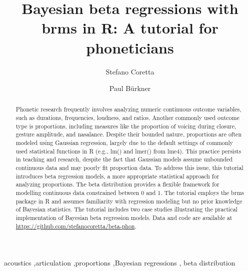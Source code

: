 \documentclass[
  authoryear,
  preprint,
  3p]{elsarticle}
\begin{document}
\begin{frontmatter}
\title{Bayesian beta regressions with brms in R: A tutorial for
phoneticians}
\author[1]{Stefano Coretta%
%
}
\author[2]{Paul Bürkner%
%
}



        
\begin{abstract}
Phonetic research frequently involves analyzing numeric continuous
outcome variables, such as durations, frequencies, loudness, and ratios.
Another commonly used outcome type is proportions, including measures
like the proportion of voicing during closure, gesture amplitude, and
nasalance. Despite their bounded nature, proportions are often modeled
using Gaussian regression, largely due to the default settings of
commonly used statistical functions in R (e.g., lm() and lmer() from
lme4). This practice persists in teaching and research, despite the fact
that Gaussian models assume unbounded continuous data and may poorly fit
proportion data. To address this issue, this tutorial introduces beta
regression models, a more appropriate statistical approach for analyzing
proportions. The beta distribution provides a flexible framework for
modelling continuous data constrained between 0 and 1. The tutorial
employs the brms package in R and assumes familiarity with regression
modeling but no prior knowledge of Bayesian statistics. The tutorial
includes two case studies illustrating the practical implementation of
Bayesian beta regression models. Data and code are available at
\url{https://github.com/stefanocoretta/beta-phon}.
\end{abstract}





\begin{keyword}
    acoustics \sep articulation \sep proportions \sep Bayesian
regressions \sep 
    beta distribution
\end{keyword}
\end{frontmatter}
\end{document}
